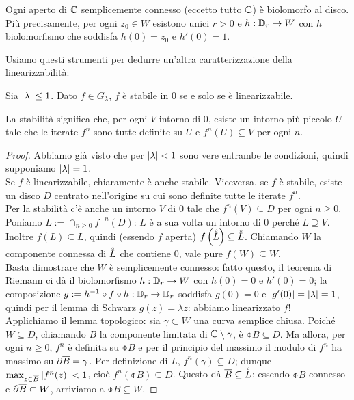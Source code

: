 \begin{teo}[Riemann]Ogni aperto di $\mathbb{C}$ semplicemente connesso (eccetto tutto $\mathbb{C}$) è biolomorfo al disco.
Più precisamente, per ogni $z_0\in W$ esistono unici $r>0$ e $h:\mathbb{D}_r\to W$ con $h$ biolomorfismo
che soddisfa $h(0)=z_0$ e $h'(0)=1$.
\end{teo}

Usiamo questi strumenti per dedurre un'altra caratterizzazione della linearizzabilità:

\begin{teo}Sia $\left|\lambda\right|\le 1$. Dato $f\in G_\lambda$, $f$ è stabile in $0$ se e solo se è linearizzabile.
\end{teo}

La stabilità significa che, per ogni $V$ intorno di $0$, esiste un intorno più piccolo $U$ tale che
le iterate $f^n$ sono tutte definite su $U$ e $f^n(U)\subseteq V$ per ogni $n$.

\begin{proof}Abbiamo già visto che per $\left|\lambda\right|<1$ sono vere entrambe le condizioni,
quindi supponiamo $\left|\lambda\right|=1$. \\
Se $f$ è linearizzabile, chiaramente è anche stabile. Viceversa, se $f$ è stabile, esiste un disco $D$
centrato nell'origine su cui sono definite tutte le iterate $f^n$. \\
Per la stabilità c'è anche un intorno $V$ di $0$ tale che $f^n(V)\subseteq D$ per ogni $n\ge 0$.
Poniamo $L:=\cap_{n\ge 0}f^{-n}(D)$: $L$ è a sua volta un intorno di $0$ perché $L\supseteq V$. \\
Inoltre $f(L)\subseteq L$, quindi (essendo $f$ aperta) $f\left(\accentset{\circ}{L}\right)\subseteq\accentset{\circ}{L}$.
Chiamando $W$ la componente connessa di $\accentset{\circ}{L}$ che contiene $0$, vale pure $f(W)\subseteq W$. \\
Basta dimostrare che $W$ è semplicemente connesso: fatto questo, il teorema di Riemann ci dà
il biolomorfismo $h:\mathbb{D}_r\to W$ con $h(0)=0$ e $h'(0)=0$; la composizione $g:=h^{-1}\circ f\circ h:\mathbb{D}_r\to\mathbb{D}_r$
soddisfa $g(0)=0$ e $\left|g'(0)\right|=\left|\lambda\right|=1$, quindi per il lemma di Schwarz $g(z)=\lambda z$:
abbiamo linearizzato $f$! \\
Applichiamo il lemma topologico: sia $\gamma\subset W$ una curva semplice chiusa. Poiché $W\subseteq D$,
chiamando $B$ la componente limitata di $\mathbb{C}\setminus\gamma$, è $\obar{B}\subseteq D$.
Ma allora, per ogni $n\ge 0$, $f^n$ è definita su $\obar{B}$ e per il principio del massimo
il modulo di $f^n$ ha massimo su $\partial\overline{B}=\gamma$. Per definizione di $L$, $f^n(\gamma)\subseteq D$;
dunque $\max_{z\in\overline{B}}\left|f^n(z)\right|<1$, cioè $f^n(\obar{B})\subseteq D$.
Questo dà $\overline{B}\subseteq\accentset{\circ}{L}$; essendo $\obar{B}$ connesso e $\partial\overline{B}\subset W$, arriviamo a $\obar{B}\subseteq W$.
\end{proof}

